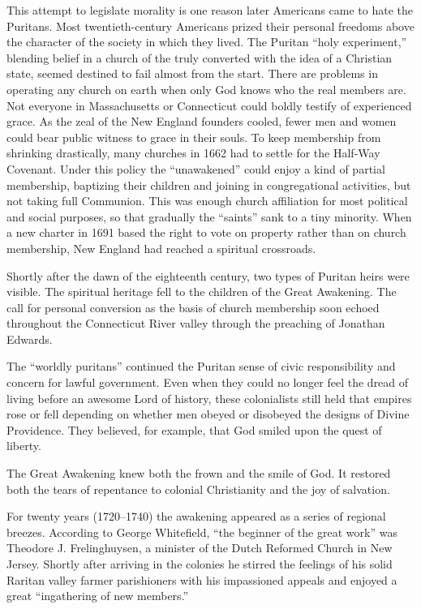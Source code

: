 This attempt to legislate morality is one reason later Americans came to hate the Puritans. Most
twentieth-century Americans prized their personal freedoms above the character of the society in
which they lived. The Puritan “holy experiment,” blending belief in a church of the truly converted
with the idea of a Christian state, seemed destined to fail almost from the start. There are
problems in operating any church on earth when only God knows who the real members are. Not everyone
in Massachusetts or Connecticut could boldly testify of experienced grace. As the zeal of the New
England founders cooled, fewer men and women could bear public witness to grace in their souls. To
keep membership from shrinking drastically, many churches in 1662 had to settle for the Half-Way
Covenant. Under this policy the “unawakened” could enjoy a kind of partial membership, baptizing
their children and joining in congregational activities, but not taking full Communion. This was
enough church affiliation for most political and social purposes, so that gradually the “saints”
sank to a tiny minority. When a new charter in 1691 based the right to vote on property rather than
on church membership, New England had reached a spiritual crossroads.

Shortly after the dawn of the eighteenth century, two types of Puritan heirs were visible. The
spiritual heritage fell to the children of the Great Awakening. The call for personal conversion as
the basis of church membership soon echoed throughout the Connecticut River valley through the
preaching of Jonathan Edwards.

The “worldly puritans” continued the Puritan sense of civic responsibility and concern for lawful
government. Even when they could no longer feel the dread of living before an awesome Lord of
history, these colonialists still held that empires rose or fell depending on whether men obeyed or
disobeyed the designs of Divine Providence. They believed, for example, that God smiled upon the
quest of liberty.

The Great Awakening knew both the frown and the smile of God. It restored both the tears of
repentance to colonial Christianity and the joy of salvation.

For twenty years (1720–1740) the awakening appeared as a series of regional breezes. According to
George Whitefield, “the beginner of the great work” was Theodore J. Frelinghuysen, a minister of the
Dutch Reformed Church in New Jersey. Shortly after arriving in the colonies he stirred the feelings
of his solid Raritan valley farmer parishioners with his impassioned appeals and enjoyed a great
“ingathering of new members.”

